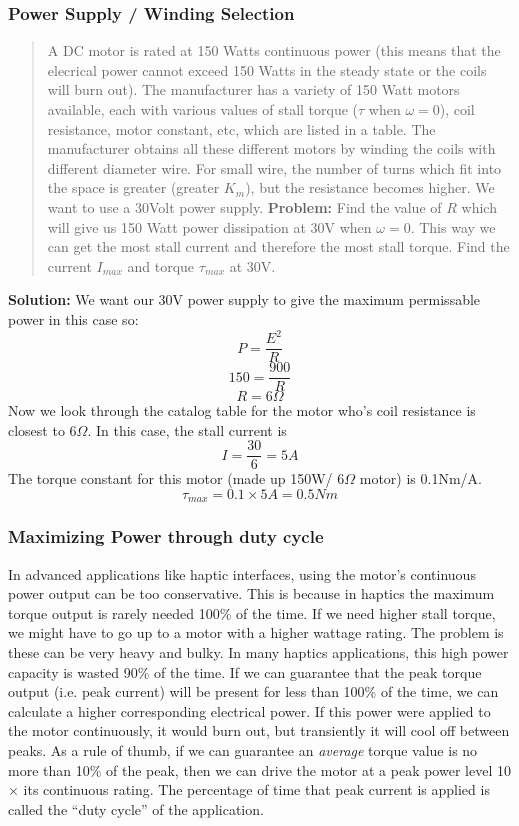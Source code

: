 \subsubsection{Power Supply / Winding Selection}
\begin{quotation}
        A DC motor is rated at 150 Watts continuous power (this means that
        the elecrical power cannot exceed 150 Watts in the steady state
        or the coils will burn out).    The manufacturer has a variety of
        150 Watt motors available, each with various values of stall torque
        ($\tau$ when $\omega=0$), coil resistance, motor constant, etc,
        which are listed in a table.
        The manufacturer obtains all these different motors by winding the
        coils with different diameter wire.   For small wire, the number of
        turns which fit into the space is greater (greater $K_m$), but the
        resistance becomes higher.
        We want to use a 30Volt power supply.
        {\bf Problem: } Find the value of $R$ which will give us 150 Watt
        power dissipation at 30V when $\omega =0$.   This way we can get the
        most stall current and therefore the most stall torque.  Find the
        current $I_{max}$ and torque $\tau_{max}$ at 30V.
\end{quotation}

{\bf Solution:}   We want
our 30V power supply to give the maximum permissable
power in this case so:
\[
P = \frac{E^2}{R}
\]
\[
150 = \frac{900}{R}
\]
\[
R = 6\Omega
\]
Now we look through the catalog table for the motor who's coil resistance
is closest to 6$\Omega$.   In this case, the stall current is
\[
I = \frac{30}{6} = 5A
\]
The torque constant for this motor (made up 150W/ 6$\Omega$ motor) is
0.1Nm/A.
\[
\tau_{max} = 0.1 \times 5A = 0.5Nm
\]

\subsubsection{Maximizing Power through duty cycle}

In advanced applications like haptic interfaces, using the motor's continuous power
output can be too conservative.
This is because in haptics the maximum torque output is rarely  needed
100\% of the time.  If we need higher stall torque, we might have to go
up to a motor with a higher wattage rating.  The problem is these can be
very heavy and bulky.  In many haptics applications, this high power capacity
is wasted 90\% of the time.  If we can guarantee that
the peak torque output
(i.e. peak current) will be present for less than 100\% of the time,
we can calculate a higher corresponding electrical power.  If this power
were applied to the motor continuously, it would burn out, but transiently
it will cool off between peaks.     As a rule of thumb, if we can guarantee
an {\it average} torque value is no more than 10\% of the peak, then
we can drive the motor
at a peak power level 10$\times$ its continuous rating.   The percentage of time
that peak current is applied is called the ``duty cycle'' of the application.


